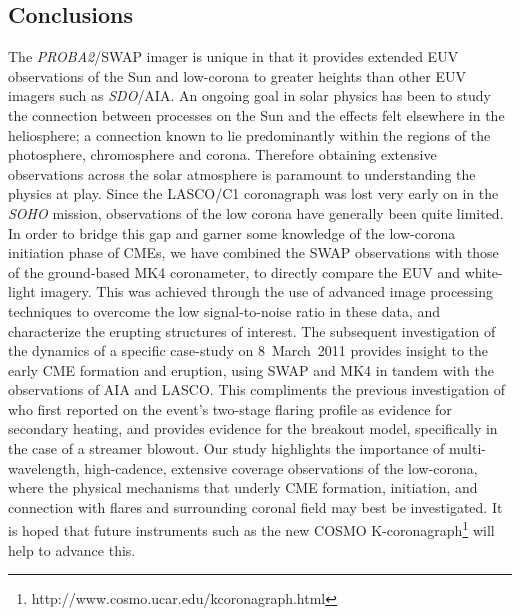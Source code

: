\documentclass[namedreferences]{solarphysics}
\begin{document}
\begin{article}
\section{Conclusions}
\label{sect:conclusions}

The \emph{PROBA2}/SWAP imager is unique in that it provides extended EUV observations of the Sun and low-corona to greater heights than other EUV imagers such as \emph{SDO}/AIA. An ongoing goal in solar physics has been to study the connection between processes on the Sun and the effects felt elsewhere in the heliosphere; a connection known to lie predominantly within the regions of the photosphere, chromosphere and corona. Therefore obtaining extensive observations across the solar atmosphere is paramount to understanding the physics at play. Since the LASCO/C1 coronagraph was lost very early on in the \emph{SOHO} mission, observations of the low corona have generally been quite limited. In order to bridge this gap and garner some knowledge of the low-corona initiation phase of CMEs, we have combined the SWAP observations with those of the ground-based MK4 coronameter, to directly compare the EUV and white-light imagery. This was achieved through the use of advanced image processing techniques to overcome the low signal-to-noise ratio in these data, and characterize the erupting structures of interest. The subsequent investigation of the dynamics of a specific case-study on 8~March~2011 provides insight to the early CME formation and eruption, using SWAP and MK4 in tandem with the observations of AIA and LASCO. This compliments the previous investigation of  who first reported on the event's two-stage flaring profile as evidence for secondary heating, and provides evidence for the breakout model, specifically in the case of a streamer blowout. Our study highlights the importance of multi-wavelength, high-cadence, extensive coverage observations of the low-corona, where the physical mechanisms that underly CME formation, initiation, and connection with flares and surrounding coronal field may best be investigated. It is hoped that future instruments such as the new COSMO K-coronagraph\footnote{http://www.cosmo.ucar.edu/kcoronagraph.html} will help to advance this.





%




\end{article}
\end{document}
